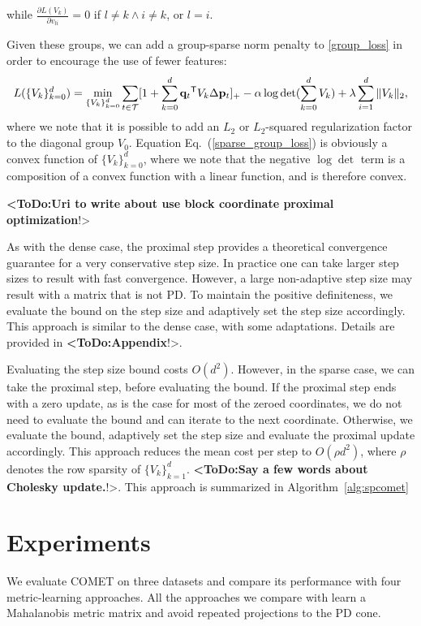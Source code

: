 \documentclass[twoside,11pt]{article}
\newcommand\todo[1]{\textbf{<ToDo:#1}!>}
\newcommand\mat[1]{{#1}}
\renewcommand\vec[1]{\mathbf{#1}}
\newcommand{\T}{{}^\mathsf{T}}
\newcommand{\q}{{\vec{q}}}
\newcommand{\trip}{{t}}
\newcommand{\qt}{{\q_{\trip}}}
\newcommand{\Vk}{\mat{V_k}}
\newcommand{\Vg}{\{\Vk\}_{k=0}^{d}} %
\newcommand{\Vgrc}{\{\Vk\}_{k=1}^{d}} %
\renewcommand{\eqref}[1]{Eq.~(\ref{#1})}
\begin{document}
while $\frac{\partial {L (V_k)}}{\partial v_{li}}=0$ if  $l \neq k \wedge i \neq k$, or $l=i$.

Given these groups, we can add a group-sparse norm penalty to  \ref{group_loss} in order to encourage the use of fewer features:
\begin{equation}
L(\Vg) = 
  \min_{\Vg} \sum_{\trip \in \cal{T}}  [1+\sum_{k=0}^{d}{\qt\T \Vk\Delta \vec{p}_t } ]_{+} - \alpha \log \det(\sum_{k=0}^{d}{\Vk}) + \lambda \sum_{i=1}^d \|V_k\|_2,
  \label{sparse_group_loss}
\end{equation} 
where we note that it is possible to add an $L_2$ or $L_2$-squared regularization factor to the diagonal group $V_0$. Equation \eqref{sparse_group_loss} is obviously a convex function of $\Vg$, where we note that the negative $\log \det$ term is a composition of a convex function with a linear function, and is therefore convex.

\todo{Uri to write about use block coordinate proximal optimization}

As with the dense case, the proximal step provides a theoretical convergence guarantee for a very conservative step size. In practice one can take larger step sizes to result with fast convergence. However, a large non-adaptive step size may result with a matrix that is not PD. To maintain the positive definiteness, we evaluate the bound on the step size and adaptively set the step size accordingly. This approach is similar to the dense case, with some adaptations. Details are provided in \todo{Appendix}. 

Evaluating the step size bound costs $O(d^2)$. However, in the sparse case, we can take the proximal step, before evaluating the bound. If the proximal step ends with a zero update, as is the case for most of the zeroed coordinates, we do not need to evaluate the bound and can iterate to the next coordinate. Otherwise, we evaluate the bound, adaptively set the step size and evaluate the proximal update accordingly. This approach reduces the mean cost per step to $O(\rho d^2)$, where $\rho$ denotes the row sparsity of $\Vgrc$. \todo{Say a few words about Cholesky update.}. This approach is summarized in Algorithm~\ref{alg:spcomet}



\section{Experiments}
We evaluate COMET on three datasets and compare its performance with four metric-learning approaches. All the approaches we compare with learn a Mahalanobis metric matrix and avoid repeated projections to the PD cone. 
\end{document}
